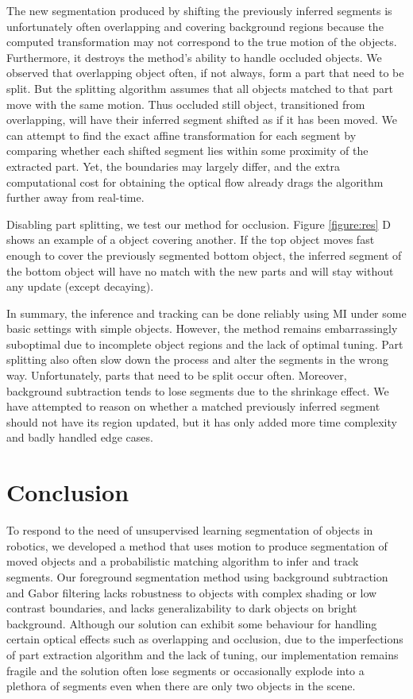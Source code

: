 \documentclass{article}
\begin{document}
The new segmentation produced by shifting the previously inferred segments is unfortunately often overlapping and covering background regions because the computed transformation may not correspond to the true motion of the objects. Furthermore, it destroys the method's ability to handle occluded objects. We observed that overlapping object often, if not always, form a part that need to be split. But the splitting algorithm assumes that all objects matched to that part move with the same motion. Thus occluded still object, transitioned from overlapping, will have their inferred segment shifted as if it has been moved. We can attempt to find the exact affine transformation for each segment by comparing whether each shifted segment lies within some proximity of the extracted part. Yet, the boundaries may largely differ, and the extra computational cost for obtaining the optical flow already drags the algorithm further away from real-time. 

Disabling part splitting, we test our method for occlusion. Figure \ref{figure:res} D shows an example of a object covering another. If the top object moves fast enough to cover the previously segmented bottom object, the inferred segment of the bottom object will have no match with the new parts and will stay without any update (except decaying). 

In summary, the inference and tracking can be done reliably using MI under some basic settings with simple objects. However, the method remains embarrassingly suboptimal due to incomplete object regions and the lack of optimal tuning. Part splitting also often slow down the process and alter the segments in the wrong way. Unfortunately, parts that need to be split occur often. Moreover, background subtraction tends to lose segments due to the shrinkage effect. We have attempted to reason on whether a matched previously inferred segment should not have its region updated, but it has only added more time complexity and badly handled edge cases. 

\section{Conclusion}

To respond to the need of unsupervised learning segmentation of objects in robotics, we developed a method that uses motion to produce segmentation of moved objects and a probabilistic matching algorithm to infer and track segments. Our foreground segmentation method using background subtraction and Gabor filtering lacks robustness to objects with complex shading or low contrast boundaries, and lacks generalizability to dark objects on bright background. Although our solution can exhibit some behaviour for handling certain optical effects such as overlapping and occlusion, due to the imperfections of part extraction algorithm and the lack of tuning, our implementation remains fragile and the solution often lose segments or occasionally explode into a plethora of segments even when there are only two objects in the scene. 
\end{document}

